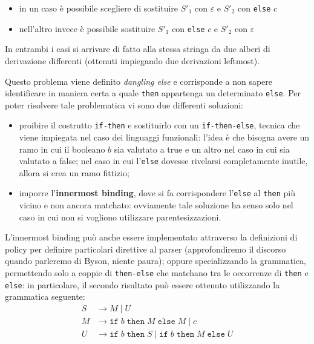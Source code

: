\documentclass[class=book, crop=false, oneside, 12pt]{standalone}
\begin{document}
\begin{itemize}
	\item in un caso è possibile scegliere di sostituire \({S'}_1\) con \(\varepsilon\) e \({S'}_2\) con \texttt{else} \(c\)
	\item nell'altro invece è possibile sostituire \({S'}_1\) con \texttt{else} \(c\) e \({S'}_2\) con \(\varepsilon\)
\end{itemize}

In entrambi i casi si arrivare di fatto alla stessa stringa da due alberi di derivazione differenti (ottenuti impiegando due derivazioni leftmost).

Questo problema viene definito \emph{dangling else} e corrisponde a non sapere identificare in maniera certa a quale \texttt{then} appartenga un determinato \texttt{else}. Per poter risolvere tale problematica vi sono due differenti soluzioni:
\begin{itemize}
    \item proibire il costrutto \texttt{if-then} e sostituirlo con un \texttt{if-then-else}, tecnica che viene impiegata nel caso dei linguaggi funzionali: l'idea è che bisogna avere un ramo in cui il booleano \(b\) sia valutato a true e un altro nel caso in cui sia valutato a false; nel caso in cui l'\texttt{else} dovesse rivelarsi completamente inutile, allora si crea un ramo fittizio;
    \item imporre l'\textbf{innermost binding}, dove si fa corrispondere l'\texttt{else} al \texttt{then} più vicino e non ancora matchato: ovviamente tale soluzione ha senso solo nel caso in cui non si vogliono utilizzare parentesizzazioni.
\end{itemize}
L'innermost binding può anche essere implementato attraverso la definizioni di policy per definire particolari direttive al parser (approfondiremo il discorso quando parleremo di Byson, niente paura); oppure specializzando la grammatica, permettendo solo a coppie di \texttt{then-else} che matchano tra le occorrenze di \texttt{then} e \texttt{else}: in particolare, il secondo risultato può essere ottenuto utilizzando la grammatica seguente:
\begin{align*}
    S &\rightarrow M \mid U \\
    M &\rightarrow \texttt{if} \; b \; \texttt{then} \; M \; \texttt{else} \; M \mid c \\
    U &\rightarrow \texttt{if} \; b \; \texttt{then} \; S \mid \texttt{if} \; b \; \texttt{then} \; M \; \texttt{else} \; U
\end{align*}
\end{document}

